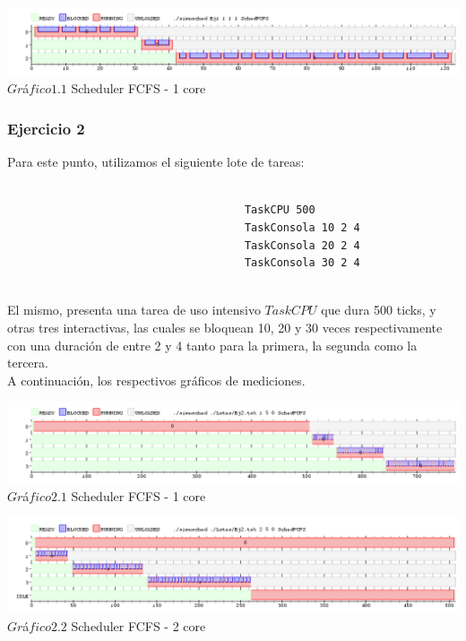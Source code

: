 \vspace*{0.3cm} \vspace*{0.3cm}
  \begin{center}
 \includegraphics[scale=0.5]{./Test/ej1.png}
 { $Gr$\'a$fico 1.1$ Scheduler FCFS - 1 core }
 \end{center}
  \vspace*{0.3cm}



\subsubsection[Resolución Ejercicio 2]{Ejercicio 2}

\indent Para este punto, utilizamos el siguiente lote de tareas:
\begin{verbatim}
 
                                     TaskCPU 500
                                     TaskConsola 10 2 4
                                     TaskConsola 20 2 4
                                     TaskConsola 30 2 4


\end{verbatim}

\indent El mismo, presenta una tarea de uso intensivo $TaskCPU$ que dura 500 ticks, y otras tres interactivas, las cuales se
bloquean 10, 20 y 30 veces respectivamente con una duración de entre 2 y 4 tanto para la primera, la segunda como la tercera.\\
A continuación, los respectivos gráficos de mediciones.


\vspace*{0.3cm} \vspace*{0.3cm}
  \begin{center}
 \includegraphics[scale=0.5]{ej21nucleo.png}
 { $Gr$\'a$fico 2.1$ Scheduler FCFS - 1 core }
 \end{center}
  \vspace*{0.3cm}
 
  
\vspace*{0.3cm} \vspace*{0.3cm}
  \begin{center}
 \includegraphics[scale=0.5]{ej22nucleo.png}
 { $Gr$\'a$fico 2.2$ Scheduler FCFS - 2 core }
 \end{center}
  \vspace*{0.3cm}
  
